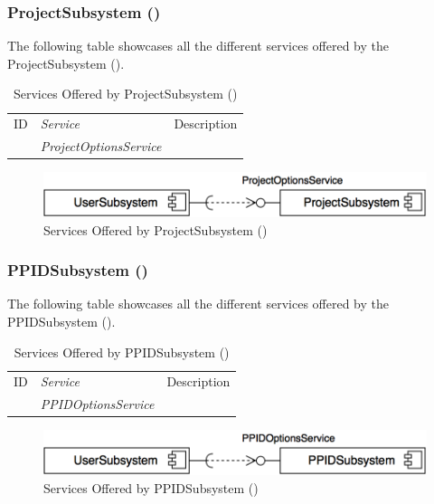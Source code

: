 \documentclass[12pt,letterpaper]{article}
\begin{document}
\subsubsection{ProjectSubsystem ()}

\noindent{}
The following table showcases all the different services offered by the ProjectSubsystem ().

\begin{table}[H]
	\caption{Services Offered by ProjectSubsystem ()} 
	\begin{tabu} to 
		\tableheader{}ID & Service & Description\\
		 & ProjectOptionsService & \\
	\end{tabu}
\end{table}

\begin{figure}[H]
	\centering{}
	\includegraphics[scale=0.40]{imgs/d3/services/project-subsystem.png}
	\caption{Services Offered by ProjectSubsystem ()}
\end{figure}

\subsubsection{PPIDSubsystem ()}

\noindent{}
The following table showcases all the different services offered by the PPIDSubsystem ().

\begin{table}[H]
	\caption{Services Offered by PPIDSubsystem ()} 
	\begin{tabu} to 
		\tableheader{}ID & Service & Description\\
		 & PPIDOptionsService & \\
	\end{tabu}
\end{table}

\begin{figure}[H]
	\centering{}
	\includegraphics[scale=0.40]{imgs/d3/services/ppid-subsystem.png}
	\caption{Services Offered by PPIDSubsystem ()}
\end{figure}
\end{document}
